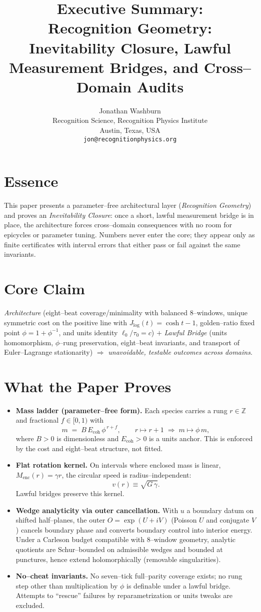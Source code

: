 \documentclass[11pt]{article}
\title{Executive Summary:\\
\large Recognition Geometry: Inevitability Closure, Lawful Measurement Bridges, and Cross--Domain Audits}
\author{Jonathan Washburn\\
Recognition Science, Recognition Physics Institute\\
Austin, Texas, USA\\
\texttt{jon@recognitionphysics.org}}
\date{}
\begin{document}
\maketitle

\section*{Essence}
This paper presents a parameter--free architectural layer (\emph{Recognition Geometry}) and proves an \emph{Inevitability Closure}: once a short, lawful measurement bridge is in place, the architecture forces cross--domain consequences with no room for epicycles or parameter tuning. Numbers never enter the core; they appear only as finite certificates with interval errors that either pass or fail against the same invariants.

\section*{Core Claim}
\emph{Architecture} (eight--beat coverage/minimality with balanced $8$--windows, unique symmetric cost on the positive line with $J_{\log}(t)=\cosh t-1$, golden--ratio fixed point $\phi=1+\phi^{-1}$, and units identity $\ell_0/\tau_0=c$) $+$ \emph{Lawful Bridge} (units homomorphism, $\phi$--rung preservation, eight--beat invariants, and transport of Euler--Lagrange stationarity) $\Rightarrow$ \emph{unavoidable, testable outcomes across domains}.

\section*{What the Paper Proves}
\begin{itemize}
  \item \textbf{Mass ladder (parameter--free form).} Each species carries a rung $r\in\mathbb{Z}$ and fractional $f\in[0,1)$ with
  \[
     m \;=\; B\,E_{\mathrm{coh}}\,\phi^{\,r+f}, \qquad r\mapsto r+1 \;\Rightarrow\; m \mapsto \phi\,m,
  \]
  where $B>0$ is dimensionless and $E_{\mathrm{coh}}>0$ is a units anchor. This is enforced by the cost and eight--beat structure, not fitted.
  \item \textbf{Flat rotation kernel.} On intervals where enclosed mass is linear, $M_{\mathrm{enc}}(r)=\gamma r$, the circular speed is radius--independent:
  \[
     v(r)\equiv \sqrt{G\,\gamma}.
  \]
  Lawful bridges preserve this kernel.
  \item \textbf{Wedge analyticity via outer cancellation.} With $u$ a boundary datum on shifted half--planes, the outer $O=\exp(U+iV)$ (Poisson $U$ and conjugate $V$) cancels boundary phase and converts boundary control into interior energy. Under a Carleson budget compatible with $8$--window geometry, analytic quotients are Schur--bounded on admissible wedges and bounded at punctures, hence extend holomorphically (removable singularities).
  \item \textbf{No--cheat invariants.} No seven--tick full--parity coverage exists; no rung step other than multiplication by $\phi$ is definable under a lawful bridge. Attempts to ``rescue'' failures by reparametrization or units tweaks are excluded.
\end{itemize}
\end{document}
